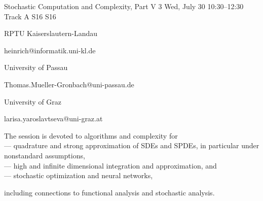 \begin{talk}
  {Stochastic Computation and Complexity, Part V}%
  {3}%
  {}%
  {}%
  {}%
  {}%
  {Wed, July 30 10:30–12:30 Track A}%
  {S16}%
  {S16}%


  {%


	{RPTU Kaiserslautern-Landau}%


	{heinrich@informatik.uni-kl.de}}%


 {%


{University of Passau}%


    {Thomas.Mueller-Gronbach@uni-passau.de}}%


  {%


	{University of Graz}%


	{larisa.yaroslavtseva@uni-graz.at}}%





The session is devoted to algorithms and complexity for\\





--- quadrature and strong approximation of SDEs and SPDEs, in particular under nonstandard assumptions,\\





--- high and infinite dimensional integration and approximation, and\\





--- stochastic optimization and neural networks,





including connections to functional analysis and stochastic analysis.








\medskip






\end{talk}
